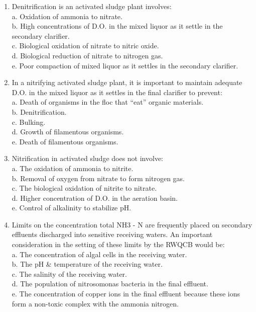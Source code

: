 \begin{tcolorbox}[breakable, enhanced,
colframe=blue!25,
colback=blue!10,
coltitle=blue!20!black,  
title= Chapter Assessment]
\begin{enumerate}
a. Aerobic \\
b. Anoxic \\
c. Anaerobic \\
d. Facultative 

\item Denitrification is an activated sludge plant involves: \\

a. Oxidation of ammonia to nitrate. \\
b. High concentrations of D.O. in the mixed liquor as it settle in the secondary clarifier. \\
c. Biological oxidation of nitrate to nitric oxide. \\
d. Biological reduction of nitrate to nitrogen gas. \\
e. Poor compaction of mixed liquor as it settles in the secondary clarifier. 

\item In a nitrifying activated sludge plant, it is important to maintain adequate D.O. in the mixed liquor as it settles in the final clarifier to prevent: \\

a. Death of organisms in the floc that “eat” organic materials. \\
b. Denitrification. \\
c. Bulking. \\
d. Growth of filamentous organisms. \\
e. Death of filamentous organisms. 

\item Nitrification in activated sludge does not involve: \\

a. The oxidation of ammonia to nitrite. \\
b. Removal of oxygen from nitrate to form nitrogen gas. \\
c. The biological oxidation of nitrite to nitrate. \\
d. Higher concentration of D.O. in the aeration basin. \\
e. Control of alkalinity to stabilize pH. 

\item Limits on the concentration total NH3 - N are frequently placed on secondary effluents discharged into sensitive receiving waters. An important consideration in the setting of these limits by the RWQCB would be: \\

a. The concentration of algal cells in the receiving water. \\
b. The pH \& temperature of the receiving water. \\
c. The salinity of the receiving water. \\
d. The population of nitrosomonas bacteria in the final effluent. \\
e. The concentration of copper ions in the final effluent because these ions form a non-toxic complex with the ammonia nitrogen. 

\end{enumerate}
\end{tcolorbox}